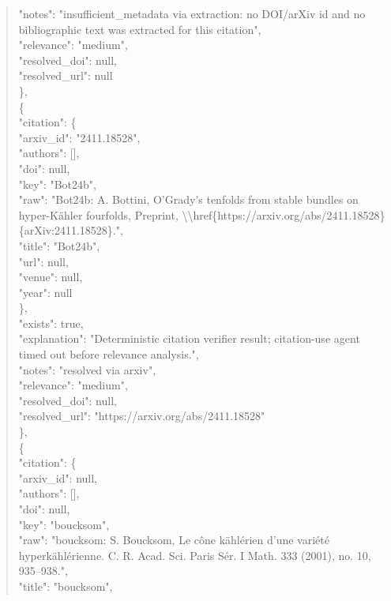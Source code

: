\documentclass[11pt]{article}
\begin{document}
\begin{quote}
      "notes": "insufficient\_metadata via extraction: no DOI/arXiv id and no bibliographic text was extracted for this citation",\\
      "relevance": "medium",\\
      "resolved\_doi": null,\\
      "resolved\_url": null\\
    \},\\
    \{\\
      "citation": \{\\
        "arxiv\_id": "2411.18528",\\
        "authors": [],\\
        "doi": null,\\
        "key": "Bot24b",\\
        "raw": "Bot24b: A. Bottini, O'Grady's tenfolds from stable bundles on hyper-Kähler fourfolds, Preprint, \textbackslash{}\textbackslash{}href\{https://arxiv.org/abs/2411.18528\}\{arXiv:2411.18528\}.",\\
        "title": "Bot24b",\\
        "url": null,\\
        "venue": null,\\
        "year": null\\
      \},\\
      "exists": true,\\
      "explanation": "Deterministic citation verifier result; citation-use agent timed out before relevance analysis.",\\
      "notes": "resolved via arxiv",\\
      "relevance": "medium",\\
      "resolved\_doi": null,\\
      "resolved\_url": "https://arxiv.org/abs/2411.18528"\\
    \},\\
    \{\\
      "citation": \{\\
        "arxiv\_id": null,\\
        "authors": [],\\
        "doi": null,\\
        "key": "boucksom",\\
        "raw": "boucksom: S. Boucksom, Le cône kählérien d'une variété hyperkählérienne. C. R. Acad. Sci. Paris Sér. I Math. 333 (2001), no. 10, 935--938.",\\
        "title": "boucksom",\\

\end{quote}
\end{document}
